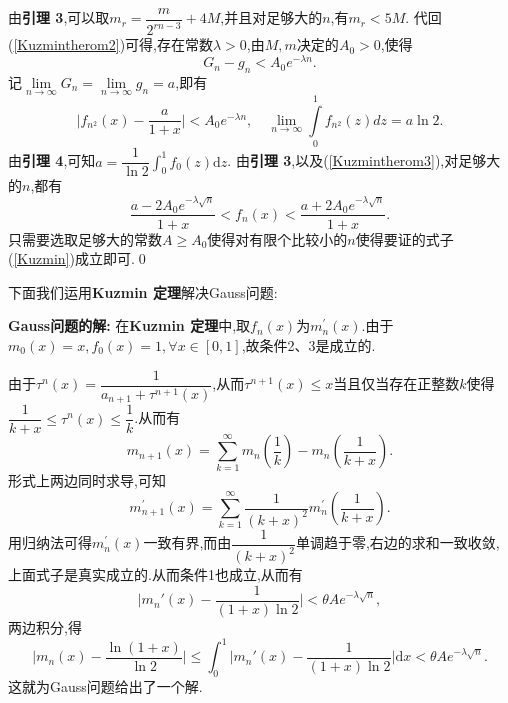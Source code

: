 由\textbf{引理 3},可以取$m_r = \dfrac{m}{2^{rn-3}} + 4M$,并且对足够大的$n$,有$m_r<5M$.
代回(\ref{Kuzmintherom2})可得,存在常数$\lambda>0$,由$M,m$决定的$A_0>0$,使得
$$G_n-g_n<A_0e^{-\lambda n}.$$
记$\lim\limits_{n\to\infty}G_n=\lim\limits_{n\to\infty}g_n=a$,即有
\begin{equation}\label{Kuzmintherom3}
\Big|f_{n^2}(x)-\frac{a}{1+x}\Big|<A_0 e^{-\lambda n},\quad \lim_{n\to\infty} \int\limits_0^1f_{n^2}(z)dz=a\ln2.
\end{equation}
由\textbf{引理 4},可知$a=\dfrac{1}{\ln2}\int_{0}^{1}f_0(z)\mathrm{d}z$.
由\textbf{引理 3},以及(\ref{Kuzmintherom3}),对足够大的$n$,都有
$$\frac{a-2A_0 e^{-\lambda\sqrt{n}}}{1+x}<f_{n}(x)<\frac{a+2A_0 e^{-\lambda\sqrt{n}}}{1+x}.$$
只需要选取足够大的常数$A\geqslant A_0$使得对有限个比较小的$n$使得要证的式子(\ref{Kuzmin})成立即可.\qed
\par
\par
下面我们运用\textbf{Kuzmin 定理}解决Gauss问题:\par
\textbf{Gauss问题的解}\textsuperscript{\cite{Kuzmin,Khinchin,Iosifescu}}\textbf{:  }
在\textbf{Kuzmin 定理}中,取$f_n(x)$为$m^{'}_n(x)$.由于$m_0(x)=x,f_0(x)=1,\forall x\in[0,1]$,故条件2、3是成立的.\par
由于$\tau^{n}(x)=\dfrac{1}{a_{n+1}+\tau^{n+1}(x)}$,从而$\tau^{n+1}(x)\leqslant x$当且仅当存在正整数$k$使得$\dfrac{1}{k+x}\leqslant\tau^{n}(x)\leqslant\dfrac{1}{k}$.从而有
$$m_{n+1}(x)=\sum_{k=1}^{\infty}m_n\left(\frac{1}{k}\right)-m_n\left(\frac{1}{k+x}\right).$$
形式上两边同时求导,可知
$$m_{n+1}^{\prime}(x)=\sum_{k=1}^{\infty}\frac{1}{(k+x)^2}m_n^{\prime}\left(\frac{1}{k+x}\right).$$
用归纳法可得$m^{'}_n(x)$一致有界,而由$\dfrac{1}{(k+x)^2}$单调趋于零,右边的求和一致收敛,上面式子是真实成立的.从而条件1也成立,从而有
$$\Big|m_n'(x)-\frac{1}{(1+x)\ln2}\Big|<\theta Ae^{-\lambda \sqrt{n}},$$
两边积分,得
$$\Big|m_n(x)-\frac{\ln{(1+x)}}{\ln{2}}\Big|\leqslant\int_0^1\Big|m_n'(x)-\frac{1}{(1+x)\ln2}\Big|\mathrm{d}x<\theta Ae^{-\lambda \sqrt{n}}.$$
这就为Gauss问题给出了一个解.    


